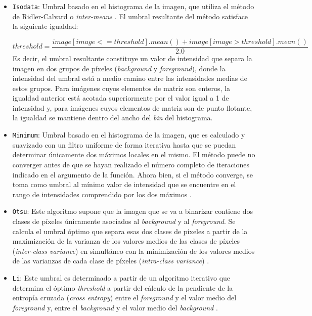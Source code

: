 \begin{itemize}
\justifying
\item \texttt{Isodata}: Umbral basado en el histograma de la imagen, que utiliza el método de Ridler-Calvard o \textit{inter-means} \cite{4310039}. El umbral resultante del método satisface la siguiente igualdad:

\begin{equation*}
threshold = \frac{image[image <= threshold].mean() +
             image[image > threshold].mean()}{2.0}
\end{equation*}
Es decir, el umbral resultante constituye un valor de intensidad que separa la imagen en dos grupos de píxeles (\textit{background} y \textit{foreground}), donde la intensidad del umbral está a medio camino entre las intensidades medias de estos grupos. Para imágenes cuyos elementos de matriz son enteros, la igualdad anterior está acotada superiormente por el valor igual a 1 de intensidad y, para imágenes cuyos elementos de matriz son de punto flotante, la igualdad se mantiene dentro del ancho del \textit{bin} del histograma.



\item \texttt{Minimum}:  Umbral basado en el histograma de la imagen, que es calculado y suavizado con un filtro uniforme de forma iterativa hasta que se puedan determinar únicamente dos máximos locales en el mismo. El método puede no converger antes de que se hayan realizado el número completo de iteraciones indicado en el argumento de la función. Ahora bien, si el método converge, se toma como umbral al mínimo valor de intensidad que se encuentre en el rango de intensidades comprendido por los dos máximos \cite{GLASBEY}.

\item \texttt{Otsu}: Este algoritmo supone que la imagen que se va a binarizar contiene dos clases de píxeles únicamente asociados al \textit{background} y al \textit{foreground}. Se calcula el umbral óptimo que separa esas dos clases de píxeles a partir de la maximización de la varianza de los valores medios de las clases de píxeles (\textit{inter-class variance}) en simultáneo con la minimización de los valores medios de las varianzas de cada clase de píxeles (\textit{intra-class variance}) \cite{otsuu}.

\item \texttt{Li}: Este umbral es determinado a partir de un algoritmo iterativo que determina el óptimo \textit{threshold} a partir del cálculo de la pendiente de la entropía cruzada (\textit{cross entropy}) entre el \textit{foreground} y el valor medio del \textit{foreground} y, entre el \textit{background} y el valor medio del \textit{background} \cite{LIl}.


\end{itemize}
